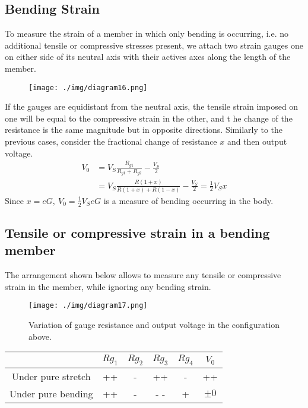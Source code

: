 \subsection{Bending Strain}
To measure the strain of a member in which only bending is occurring, i.e. no additional tensile or compressive stresses present, we attach two strain gauges one on either side of its neutral axis with their actives axes along the length of the member.
\begin{figure}[H]
  \centering
  \texttt{[image: ./img/diagram16.png]}
\end{figure}
If the gauges are equidistant from the neutral axis, the tensile strain imposed on one will be equal to the compressive strain in the other, and t he change of the resistance is the same magnitude but in opposite directions. Similarly to the previous cases, consider the fractional change of resistance $x$ and then output voltage.
\begin{align}
  V_0 & = V_S \frac{R_{g1}}{R_{g1} + R_{g2}} - \frac{V_S}{2}                     \\
      & = V_S \frac{R(1+x)}{R(1+x) + R(1-x)} - \frac{V_S}{2} = \frac{1}{2} V_S x
\end{align}
Since $x=eG, \ V_0 = \frac{1}{2} V_S eG$ is a measure of bending occurring in the body.
\subsection{Tensile or compressive strain in a bending member}
The arrangement shown below allows to measure any tensile or compressive strain in the member, while ignoring any bending strain.
\begin{figure}[H]
  \centering
  \texttt{[image: ./img/diagram17.png]}
  \caption{Variation of gauge resistance and output voltage in the configuration above.}
\end{figure}
\begin{center}
  \begin{tabular}{||c | c c c c c||}
    \hline
                       & $Rg_1$ & $Rg_2$ & $Rg_3$ & $Rg_4$ & $V_0$   \\
    \hline
    Under pure stretch & ++     & -      & ++     & -      & ++      \\
    Under pure bending & ++     & -      & - -    & +      & $\pm 0$ \\
    \hline
  \end{tabular}
\end{center}
